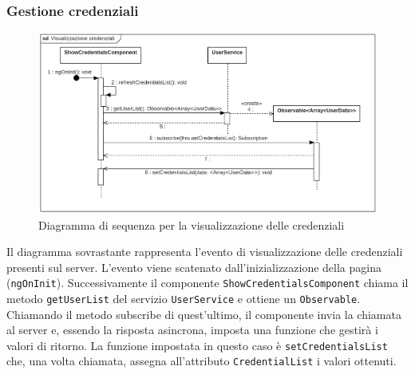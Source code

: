 \subsubsection{Gestione credenziali}
\begin{figure}[H]
	\centering
	\includegraphics[width=18cm]{res/images/webapp-showCredentials-diagrammaSequenza.png}
	\caption{Diagramma di sequenza per la visualizzazione delle credenziali}
	\label{fig:DiagrammaSequenzaVisualizzazioneCredenziali}
\end{figure}
Il diagramma sovrastante rappresenta l'evento di visualizzazione delle credenziali presenti sul server. L'evento viene scatenato dall'inizializzazione della pagina (\texttt{ngOnInit}). Successivamente il componente \texttt{ShowCredentialsComponent} chiama il metodo \texttt{getUserList} del servizio \texttt{UserService} e ottiene un \texttt{Observable}. Chiamando il metodo subscribe di quest'ultimo, il componente invia la chiamata al server e, essendo la risposta asincrona, imposta una funzione che gestirà i valori di ritorno. La funzione impostata in questo caso è \texttt{setCredentialsList} che, una volta chiamata, assegna all'attributo \texttt{CredentialList} i valori ottenuti.
